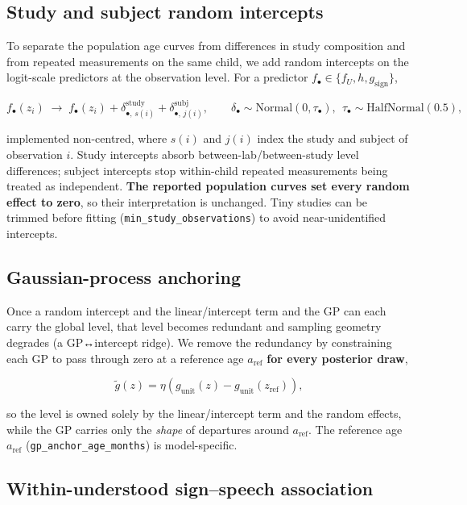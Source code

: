 \documentclass[
  11pt,
  a4paper,
]{report}
\begin{document}
\subsection{Study and subject random
intercepts}\label{sec-randomeffects}

To separate the population age curves from differences in study
composition and from repeated measurements on the same child, we add
random intercepts on the logit-scale predictors at the observation
level. For a predictor \(f_\bullet \in \{f_U, h, g_{\text{sign}}\}\),

\[
f_\bullet(z_i) \;\to\; f_\bullet(z_i) + \delta^{\text{study}}_{\bullet,\,s(i)} + \delta^{\text{subj}}_{\bullet,\,j(i)},
\qquad
\delta_\bullet \sim \mathrm{Normal}(0, \tau_\bullet),\ \ \tau_\bullet \sim \mathrm{HalfNormal}(0.5),
\]

implemented non-centred, where \(s(i)\) and \(j(i)\) index the study and
subject of observation \(i\). Study intercepts absorb
between-lab/between-study level differences; subject intercepts stop
within-child repeated measurements being treated as independent.
\textbf{The reported population curves set every random effect to zero},
so their interpretation is unchanged. Tiny studies can be trimmed before
fitting (\texttt{min\_study\_observations}) to avoid near-unidentified
intercepts.

\subsection{Gaussian-process anchoring}\label{sec-gpanchor}

Once a random intercept and the linear/intercept term and the GP can
each carry the global level, that level becomes redundant and sampling
geometry degrades (a GP↔intercept ridge). We remove the redundancy by
constraining each GP to pass through zero at a reference age
\(a_{\text{ref}}\) \textbf{for every posterior draw},

\[
\tilde{g}(z) = \eta\left(g_{\mathrm{unit}}(z) - g_{\mathrm{unit}}(z_{\text{ref}})\right),
\]

so the level is owned solely by the linear/intercept term and the random
effects, while the GP carries only the \emph{shape} of departures around
\(a_{\text{ref}}\). The reference age \(a_{\text{ref}}\)
(\texttt{gp\_anchor\_age\_months}) is model-specific.

\subsection{Within-understood sign--speech
association}\label{sec-association}
\end{document}
